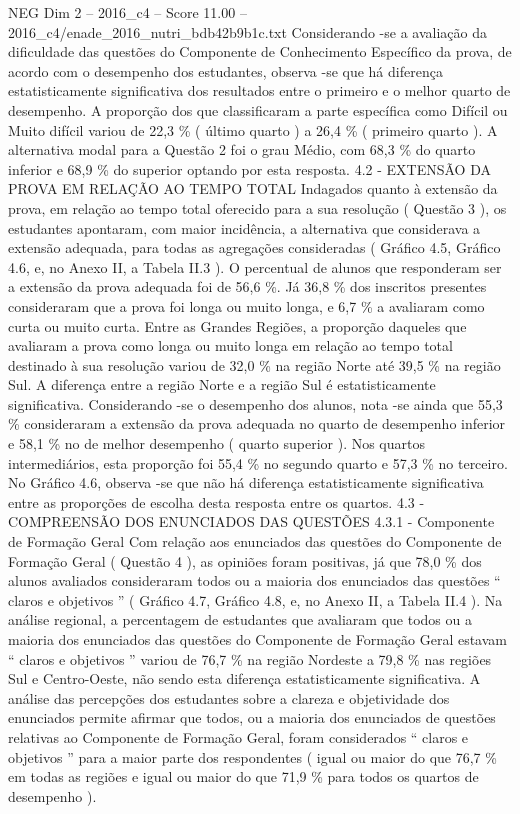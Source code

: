 \begin{textsample}{NEG Dim 2 – 2016\_c4 – Score 11.00 – 2016\_c4/enade\_2016\_nutri\_bdb42b9b1c.txt}
Considerando -se a avaliação da dificuldade das questões do Componente de Conhecimento Específico da prova, de acordo com o desempenho dos estudantes, observa -se que há diferença estatisticamente significativa dos resultados entre o primeiro e o melhor quarto de desempenho.
A proporção dos que classificaram a parte específica como Difícil ou Muito difícil variou de 22,3 \% ( último quarto ) a 26,4 \% ( primeiro quarto ).
A alternativa modal para a Questão 2 foi o grau Médio, com 68,3 \% do quarto inferior e 68,9 \% do superior optando por esta resposta. 4.2 - EXTENSÃO DA PROVA EM RELAÇÃO AO TEMPO TOTAL Indagados quanto à extensão da prova, em relação ao tempo total oferecido para a sua resolução ( Questão 3 ), os estudantes apontaram, com maior incidência, a alternativa que considerava a extensão adequada, para todas as agregações consideradas ( Gráfico 4.5, Gráfico 4.6, e, no Anexo II, a Tabela II.3 ).
O percentual de alunos que responderam ser a extensão da prova adequada foi de 56,6 \%.
Já 36,8 \% dos inscritos presentes consideraram que a prova foi longa ou muito longa, e 6,7 \% a avaliaram como curta ou muito curta.
Entre as Grandes Regiões, a proporção daqueles que avaliaram a prova como longa ou muito longa em relação ao tempo total destinado à sua resolução variou de 32,0 \% na região Norte até 39,5 \% na região Sul.
A diferença entre a região Norte e a região Sul é estatisticamente significativa.
Considerando -se o desempenho dos alunos, nota -se ainda que 55,3 \% consideraram a extensão da prova adequada no quarto de desempenho inferior e 58,1 \% no de melhor desempenho ( quarto superior ).
Nos quartos intermediários, esta proporção foi 55,4 \% no segundo quarto e 57,3 \% no terceiro.
No Gráfico 4.6, observa -se que não há diferença estatisticamente significativa entre as proporções de escolha desta resposta entre os quartos. 4.3 - COMPREENSÃO DOS ENUNCIADOS DAS QUESTÕES 4.3.1 - Componente de Formação Geral Com relação aos enunciados das questões do Componente de Formação Geral ( Questão 4 ), as opiniões foram positivas, já que 78,0 \% dos alunos avaliados consideraram todos ou a maioria dos enunciados das questões “ claros e objetivos ” ( Gráfico 4.7, Gráfico 4.8, e, no Anexo II, a Tabela II.4 ).
Na análise regional, a percentagem de estudantes que avaliaram que todos ou a maioria dos enunciados das questões do Componente de Formação Geral estavam “ claros e objetivos ” variou de 76,7 \% na região Nordeste a 79,8 \% nas regiões Sul e Centro-Oeste, não sendo esta diferença estatisticamente significativa.
A análise das percepções dos estudantes sobre a clareza e objetividade dos enunciados permite afirmar que todos, ou a maioria dos enunciados de questões relativas ao Componente de Formação Geral, foram considerados “ claros e objetivos ” para a maior parte dos respondentes ( igual ou maior do que 76,7 \% em todas as regiões e igual ou maior do que 71,9 \% para todos os quartos de desempenho ).

\end{textsample}
